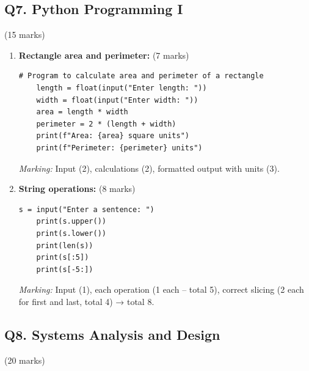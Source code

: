 \documentclass[12pt]{article}
\begin{document}
\bigskip

\subsection*{Q7. Python Programming I} \hfill (15 marks)

\begin{enumerate}[label=(\alph*)]
    \item \textbf{Rectangle area and perimeter:} \hfill (7 marks)
    \begin{lstlisting}[numbers=none]
    # Program to calculate area and perimeter of a rectangle
    length = float(input("Enter length: "))
    width = float(input("Enter width: "))
    area = length * width
    perimeter = 2 * (length + width)
    print(f"Area: {area} square units")
    print(f"Perimeter: {perimeter} units")
    \end{lstlisting}
    \textit{Marking:} Input (2), calculations (2), formatted output with units (3).

    \item \textbf{String operations:} \hfill (8 marks)
    \begin{lstlisting}[numbers=none]
    s = input("Enter a sentence: ")
    print(s.upper())
    print(s.lower())
    print(len(s))
    print(s[:5])
    print(s[-5:])
    \end{lstlisting}
    \textit{Marking:} Input (1), each operation (1 each -- total 5), correct slicing (2 each for first and last, total 4) → total 8.
\end{enumerate}

\bigskip

\subsection*{Q8. Systems Analysis and Design} \hfill (20 marks)
\end{document}
